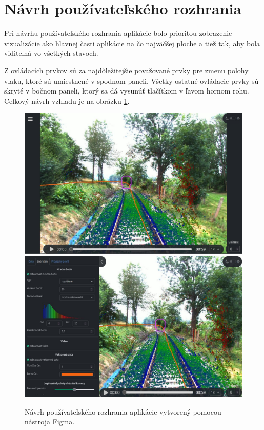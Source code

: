 \section{Návrh používateľského rozhrania}

Pri návrhu používateľského rozhrania aplikácie bolo prioritou zobrazenie vizualizácie ako hlavnej časti aplikácie na čo najväčšej ploche a tiež tak, aby bola viditeľná vo všetkých stavoch.

Z ovládacích prvkov sú za najdôležitejšie považované prvky pre zmenu polohy vlaku, ktoré sú umiestnené v spodnom paneli. Všetky ostatné ovládacie prvky sú skryté v bočnom paneli, ktorý sa dá vysunúť tlačítkom v ľavom hornom rohu. Celkový návrh vzhľadu je na obrázku \ref{fig:navrh_gui}.

\begin{figure}[h]
    \centering
    \includegraphics[width=0.9\linewidth]{text_prace/obrazky-figures/navrh1.pdf}
    \includegraphics[width=0.9\linewidth]{text_prace/obrazky-figures/navrh2.pdf}
    \caption{Návrh používateľského rozhrania aplikácie vytvorený pomocou nástroja Figma.}
    \label{fig:navrh_gui}
\end{figure}

